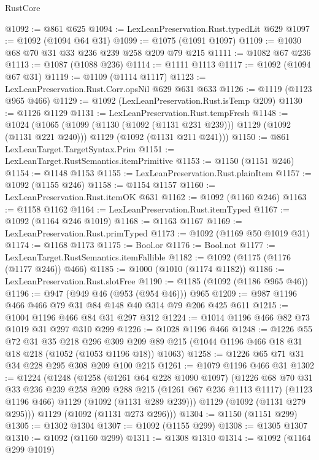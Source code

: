 \begin{lexlean}{RustCore}
\begin{coremodule}
@1092 := @861 @625
@1094 := LexLeanPreservation.Rust.typedLit @629
@1097 := @1092 (@1094 @64 @31)
@1099 := @1075 (@1091 @1097)
@1109 := @1030 @68 @70 @31 @33 @236 @239 @258 @209 @79 @215
@1111 := @1082 @67 @236
@1113 := @1087 (@1088 @236)
@1114 := @1111 @1113
@1117 := @1092 (@1094 @67 @31)
@1119 := @1109 (@1114 @1117)
@1123 := LexLeanPreservation.Rust.Corr.opsNil @629 @631 @633
@1126 := @1119 (@1123 @965 @466)
@1129 := @1092 (LexLeanPreservation.Rust.isTemp @209)
@1130 := @1126 @1129
@1131 := LexLeanPreservation.Rust.tempFresh
@1148 := @1024
    (@1065
      (@1099 (@1130 (@1092 (@1131 @231 @239))) @1129 (@1092 (@1131 @221 @240)))
      @1129
      (@1092 (@1131 @211 @241)))
@1150 := @861 LexLeanTarget.TargetSyntax.Prim
@1151 := LexLeanTarget.RustSemantics.itemPrimitive
@1153 := @1150 (@1151 @246)
@1154 := @1148 @1153
@1155 := LexLeanPreservation.Rust.plainItem
@1157 := @1092 (@1155 @246)
@1158 := @1154 @1157
@1160 := LexLeanPreservation.Rust.itemOK @631
@1162 := @1092 (@1160 @246)
@1163 := @1158 @1162
@1164 := LexLeanPreservation.Rust.itemTyped
@1167 := @1092 (@1164 @246 @1019)
@1168 := @1163 @1167
@1169 := LexLeanPreservation.Rust.primTyped
@1173 := @1092 (@1169 @50 @1019 @31)
@1174 := @1168 @1173
@1175 := Bool.or
@1176 := Bool.not
@1177 := LexLeanTarget.RustSemantics.itemFallible
@1182 := @1092 (@1175 (@1176 (@1177 @246)) @466)
@1185 := @1000 (@1010 (@1174 @1182))
@1186 := LexLeanPreservation.Rust.slotFree
@1190 := @1185 (@1092 (@1186 @965 @46))
@1196 := @947 (@949 @46 (@953 (@954 @46))) @965
@1209 := @987 @1196 @466 @466 @79 @31 @84 @148 @40 @314 @79 @206 @425 @611
@1215 := @1004 @1196 @466 @84 @31 @297 @312
@1224 := @1014 @1196 @466 @82 @73 @1019 @31 @297 @310 @299
@1226 := @1028 @1196 @466
@1248 := @1226
    @55
    @72
    @31
    @35
    @218
    @296
    @309
    @209
    @89
    @215
    (@1044 @1196 @466 @18 @31 @18 @218 (@1052 (@1053 @1196 @18)) @1063)
@1258 := @1226 @65 @71 @31 @34 @228 @295 @308 @209 @100 @215
@1261 := @1079 @1196 @466 @31
@1302 := @1224
    (@1248
      (@1258
        (@1261 @64 @228 @1090 @1097)
        (@1226
          @68
          @70
          @31
          @33
          @236
          @239
          @258
          @209
          @288
          @215
          (@1261 @67 @236 @1113 @1117)
          (@1123 @1196 @466)
          @1129
          (@1092 (@1131 @289 @239)))
        @1129
        (@1092 (@1131 @279 @295)))
      @1129
      (@1092 (@1131 @273 @296)))
@1304 := @1150 (@1151 @299)
@1305 := @1302 @1304
@1307 := @1092 (@1155 @299)
@1308 := @1305 @1307
@1310 := @1092 (@1160 @299)
@1311 := @1308 @1310
@1314 := @1092 (@1164 @299 @1019)

\end{coremodule}
\end{lexlean}
